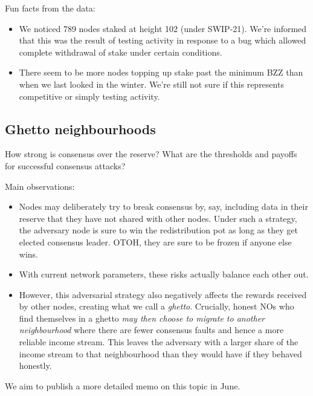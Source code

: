 Fun facts from the data:

\begin{itemize}
\item We noticed 789 nodes staked at height 102 (under SWIP-21). We're informed that this was the result of testing activity in response to a bug which allowed complete withdrawal of stake under certain conditions.
\item There seem to be more nodes topping up stake past the minimum BZZ than when we last looked in the winter. We're still not sure if this represents competitive or simply testing activity.
\end{itemize}

\subsection*{Ghetto neighbourhoods}

How strong is consensus over the reserve? What are the thresholds and payoffs for successful consensus attacks?

Main observations:

\begin{itemize}
  \item Nodes may deliberately try to break consensus by, say, including data in their reserve that they have not shared with other nodes. Under such a strategy, the adversary node is sure to win the redistribution pot as long as they get elected consensus leader. OTOH, they are sure to be frozen if anyone else wins. 
  \item With current network parameters, these risks actually balance each other out.
  \item However, this adversarial strategy also negatively affects the rewards received by other nodes, creating what we call a \emph{ghetto}. 
  Crucially, honest NOs who find themselves in a ghetto \emph{may then choose to migrate to another neighbourhood} where there are fewer consensus faults and hence a more reliable income stream.
  This leaves the adversary with a larger share of the income stream to that neighbourhood than they would have if they behaved honestly.
\end{itemize}

We aim to publish a more detailed memo on this topic in June.